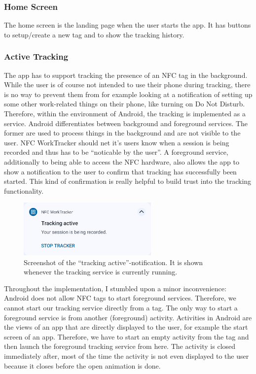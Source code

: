 \documentclass[conference]{IEEEtran}
\newcommand{\projectname}{NFC WorkTracker}
\newcommand{\phonescreenwidth}{2.69in}
\begin{document}
\subsubsection{Home Screen}
The home screen is the landing page when the user starts the app. It has buttons to setup/create a new tag and to show the tracking history.

\subsubsection{Active Tracking}
The app has to support tracking the presence of an NFC tag in the background. While the user is of course not intended to use their phone during tracking, there is no way to prevent them from for example looking at a notification of setting up some other work-related things on their phone, like turning on Do Not Disturb. Therefore, within the environment of Android, the tracking is implemented as a service. Android differentiates between background and foreground services. The former are used to process things in the background and are not visible to the user. \projectname{} should net it's users know when a session is being recorded and thus has to be ``noticable by the user''. A foreground service, additionally to being able to access the NFC hardware, also allows the app to show a notification to the user to confirm that tracking has successfully been started. This kind of confirmation is really helpful to build trust into the tracking functionality.

\begin{figure}
	\centering
	\includegraphics[width=\phonescreenwidth]{notification.png}
	\caption{Screenshot of the ``tracking active''-notification. It is shown whenever the tracking service is currently running.}
	\label{fig:notification}
\end{figure}

Throughout the implementation, I stumbled upon a minor inconvenience: Android does not allow NFC tags to start foreground services. Therefore, we cannot start our tracking service directly from a tag. The only way to start a foreground service is from another (foreground) activity. Activities in Android are the views of an app that are directly displayed to the user, for example the start screen of an app. Therefore, we have to start an empty activity from the tag and then launch the foreground tracking service from here. The activity is closed immediately after, most of the time the activity is not even displayed to the user because it closes before the open animation is done.
\end{document}
